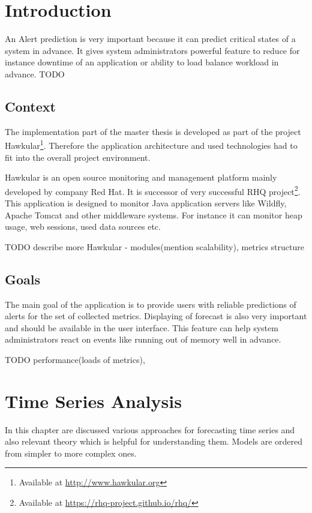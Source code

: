 
\chapter{Introduction} 
An Alert prediction is very important because it can predict critical states of a system in
advance. It gives system administrators powerful feature to reduce for instance downtime
of an application or ability to load balance workload in advance.
TODO

\section{Context}
The implementation part of the master thesis is developed as part of the project
Hawkular\footnote{Available at \url{http://www.hawkular.org}}. 
Therefore the application architecture and used technologies had to fit 
into the overall project environment.

Hawkular is an open source monitoring and management platform mainly
developed by company Red Hat. It is successor of very successful RHQ
project\footnote{Available at \url{https://rhq-project.github.io/rhq/}}.
This application is designed to monitor Java application servers
like Wildfly, Apache Tomcat and other middleware systems. 
For instance it can monitor heap usage, web sessions, used data sources etc.

TODO describe more Hawkular - modules(mention scalability), metrics structure

\section{Goals}
The main goal of the application is to provide users with reliable predictions
of alerts for the set of collected metrics. Displaying of forecast is also very
important and should be available in the user interface. This feature can help 
system administrators react on events like running out of memory well
in advance.

TODO performance(loads of metrics), 

\chapter{Time Series Analysis}
In this chapter are discussed various approaches for forecasting time series and
also relevant theory which is helpful for understanding them.
Models are ordered from simpler to more complex ones. 


